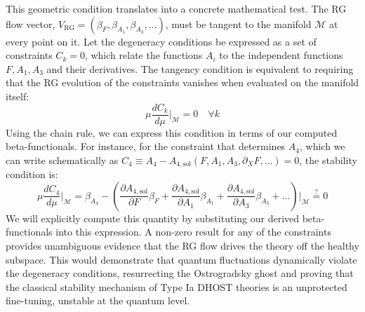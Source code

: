 \documentclass[twocolumn]{aastex631}
\begin{document}
This geometric condition translates into a concrete mathematical test. The RG flow vector, $V_{\text{RG}} = (\beta_F, \beta_{A_1}, \beta_{A_3}, \dots)$, must be tangent to the manifold $\mathcal{M}$ at every point on it. Let the degeneracy conditions be expressed as a set of constraints $C_k = 0$, which relate the functions $A_i$ to the independent functions $F, A_1, A_3$ and their derivatives. The tangency condition is equivalent to requiring that the RG evolution of the constraints vanishes when evaluated on the manifold itself:
\begin{equation}
    \mu \frac{dC_k}{d\mu} \bigg|_{\mathcal{M}} = 0 \quad \forall k
\end{equation}
Using the chain rule, we can express this condition in terms of our computed beta-functionals. For instance, for the constraint that determines $A_4$, which we can write schematically as $C_4 \equiv A_4 - A_{4,\text{sol}}(F, A_1, A_3, \partial_X F, \dots) = 0$, the stability condition is:
\begin{equation}
    \mu \frac{dC_4}{d\mu} \bigg|_{\mathcal{M}} = \beta_{A_4} - \left( \frac{\partial A_{4,\text{sol}}}{\partial F}\beta_F + \frac{\partial A_{4,\text{sol}}}{\partial A_1}\beta_{A_1} + \frac{\partial A_{4,\text{sol}}}{\partial A_3}\beta_{A_3} + \dots \right) \bigg|_{\mathcal{M}} \stackrel{?}{=} 0
\end{equation}
We will explicitly compute this quantity by substituting our derived beta-functionals into this expression. A non-zero result for any of the constraints provides unambiguous evidence that the RG flow drives the theory off the healthy subspace. This would demonstrate that quantum fluctuations dynamically violate the degeneracy conditions, resurrecting the Ostrogradsky ghost and proving that the classical stability mechanism of Type Ia DHOST theories is an unprotected fine-tuning, unstable at the quantum level.
\end{document}
